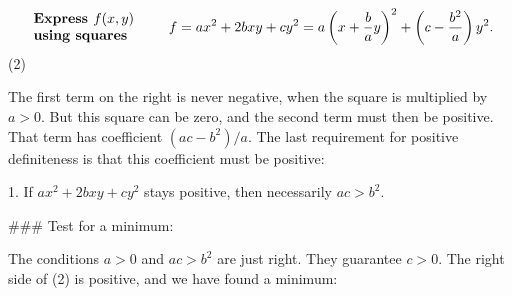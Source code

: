 \[\begin{array}{l}\mbox{\bf Express $f(x,y)$}\\ \mbox{\bf using squares}\end{array}\qquad f=ax^{2}+2bxy+cy^{2}=a\left(x+\frac{b}{a}y \right)^{2}+\left(c-\frac{b^{2}}{a}\right)y^{2}.\] (2)

The first term on the right is never negative, when the square is multiplied by \(a>0\). But this square can be zero, and the second term must then be positive. That term has coefficient \((ac-b^{2})/a\). The last requirement for positive definiteness is that this coefficient must be positive:

1. If \(ax^{2}+2bxy+cy^{2}\) stays positive, then necessarily \(ac>b^{2}\).

### Test for a minimum:

The conditions \(a>0\) and \(ac>b^{2}\) are just right. They guarantee \(c>0\). The right side of (2) is positive, and we have found a minimum: